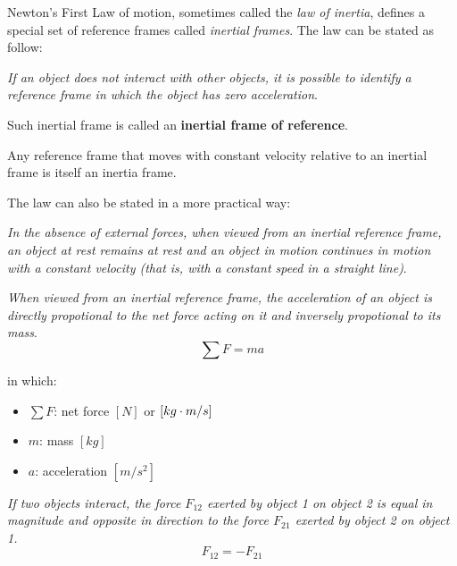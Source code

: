             \par Newton's First Law of motion, sometimes called the \textit{law of inertia},
            defines a special set of reference frames called \textit{inertial frames}. The
            law can be stated as follow:
            \par \textit{If an object does not interact with other objects, it is possible
            to identify a reference frame in which the object has zero acceleration}.
            \par Such inertial frame is called an \textbf{inertial frame of reference}.
            \par Any reference frame that moves with constant velocity relative to an
            inertial frame is itself an inertia frame.
            \par The law can also be stated in a more practical way:
            \par \textit{In the absence of external forces, when viewed from an inertial
            reference frame, an object at rest remains at rest and an object in motion
            continues in motion with a constant velocity (that is, with a constant speed in
            a straight line)}.

            \par \textit{When viewed from an inertial reference frame, the acceleration of an
            object is directly propotional to the net force acting on it and inversely propotional
            to its mass}.
            \begin{equation}
                \sum F = ma
            \end{equation}
            \par in which:
                \begin{itemize}
                    \item $\sum F$: net force $[N]$ or $[kg \cdot m/s]$
                    \item $m$: mass $[kg]$
                    \item $a$: acceleration $[m/s^2]$
                \end{itemize}

            \par \textit{If two objects interact, the force $F_{12}$ exerted by object 1 on object
            2 is equal in magnitude and opposite in direction to the force $F_{21}$ exerted by
            object 2 on object 1.}
            \begin{equation}
                F_{12} = -F_{21}
            \end{equation}

